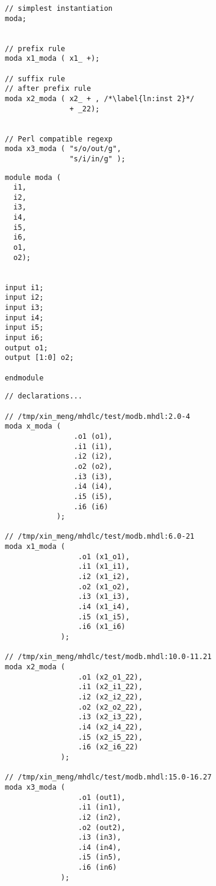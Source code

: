 \begin{minipage}[t]{.45\textwidth}
\begin{minipage}[t]{\textwidth}
\begin{lstlisting}[caption={Wrapper Module in \mhdl},label={lst:modb in mhdl}]
// simplest instantiation
moda;


// prefix rule
moda x1_moda ( x1_ +);

// suffix rule
// after prefix rule
moda x2_moda ( x2_ + , /*\label{ln:inst 2}*/
               + _22);


// Perl compatible regexp
moda x3_moda ( "s/o/out/g", 
               "s/i/in/g" );
\end{lstlisting}
\end{minipage}

\begin{minipage}[t]{\textwidth}
\begin{lstlisting}[caption={Module Template}, label={lst:moda in mhdl}]
module moda (
  i1, 
  i2, 
  i3, 
  i4, 
  i5, 
  i6, 
  o1, 
  o2);


input i1;
input i2;
input i3;
input i4;
input i5;
input i6;
output o1;
output [1:0] o2;

endmodule
\end{lstlisting}
\end{minipage}
\end{minipage}
\hspace{1ex}
\begin{minipage}[t]{.5\textwidth}
\begin{lstlisting}[caption={Wrapper module in \sv{}}, label={lst:modb in sv}]
// declarations...

// /tmp/xin_meng/mhdlc/test/modb.mhdl:2.0-4
moda x_moda (
                .o1 (o1),
                .i1 (i1),
                .i2 (i2),
                .o2 (o2),
                .i3 (i3),
                .i4 (i4),
                .i5 (i5),
                .i6 (i6)
            );

// /tmp/xin_meng/mhdlc/test/modb.mhdl:6.0-21
moda x1_moda (
                 .o1 (x1_o1),
                 .i1 (x1_i1),
                 .i2 (x1_i2),
                 .o2 (x1_o2),
                 .i3 (x1_i3),
                 .i4 (x1_i4),
                 .i5 (x1_i5),
                 .i6 (x1_i6)
             );

// /tmp/xin_meng/mhdlc/test/modb.mhdl:10.0-11.21
moda x2_moda (
                 .o1 (x2_o1_22),
                 .i1 (x2_i1_22),
                 .i2 (x2_i2_22),
                 .o2 (x2_o2_22),
                 .i3 (x2_i3_22),
                 .i4 (x2_i4_22),
                 .i5 (x2_i5_22),
                 .i6 (x2_i6_22)
             );

// /tmp/xin_meng/mhdlc/test/modb.mhdl:15.0-16.27
moda x3_moda (
                 .o1 (out1),
                 .i1 (in1),
                 .i2 (in2),
                 .o2 (out2),
                 .i3 (in3),
                 .i4 (in4),
                 .i5 (in5),
                 .i6 (in6)
             );
\end{lstlisting}
\end{minipage}
